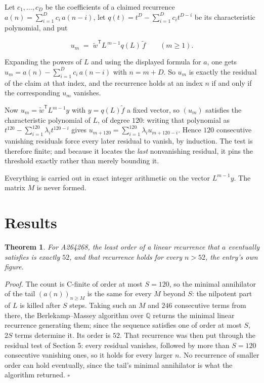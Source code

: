 \documentclass[11pt]{article}
\newtheorem{theorem}{Theorem}
\theoremstyle{definition}
\begin{document}
Let $c_1,\dots,c_D$ be the coefficients of a claimed recurrence $a(n) = \sum_{i=1}^{D} c_i\,a(n-i)$, let $q(t) = t^{D} - \sum_{i=1}^{D} c_i t^{D-i}$ be its characteristic polynomial, and put

\[u_m \;=\; \tilde w^{\mathsf T} L^{\,m-1} q(L)\,\tilde f \qquad (m \ge 1).\]

Expanding the powers of $L$ and using the displayed formula for $a$, one gets $u_m = a(n) - \sum_{i=1}^{D} c_i\,a(n-i)$ with $n = m + D$. So $u_m$ is exactly the residual of the claim at that index, and the recurrence holds at an index $n$ if and only if the corresponding $u_m$ vanishes.

Now $u_m = \tilde w^{\mathsf T} L^{m-1} y$ with $y = q(L)\tilde f$ a fixed vector, so $(u_m)$ satisfies the characteristic polynomial of $L$, of degree $120$: writing that polynomial as $t^{120} - \sum_{i=1}^{120} \lambda_i t^{120-i}$ gives $u_{m+120} = \sum_{i=1}^{120} \lambda_i u_{m+120-i}$. Hence $120$ consecutive vanishing residuals force every later residual to vanish, by induction. The test is therefore finite; and because it locates the {\itshape last} nonvanishing residual, it pins the threshold exactly rather than merely bounding it.

Everything is carried out in exact integer arithmetic on the vector $L^{m-1}y$. The matrix $M$ is never formed.

\section{Results}

\begin{theorem} For A264268, the least order of a linear recurrence that $a$ eventually satisfies is exactly $52$, and that recurrence holds for every $n > 52$, the entry's own figure.\end{theorem}

{\itshape Proof.} The count is C-finite of order at most $S = 120$, so the minimal annihilator of the tail $(a(n))_{n \ge M}$ is the same for every $M$ beyond $S$: the nilpotent part of $L$ is killed after $S$ steps. Taking such an $M$ and $246$ consecutive terms from there, the Berlekamp--Massey algorithm over $\mathbb{Q}$ returns the minimal linear recurrence generating them; since the sequence satisfies one of order at most $S$, $2S$ terms determine it. Its order is $52$. That recurrence was then put through the residual test of Section 5: every residual vanishes, followed by more than $S = 120$ consecutive vanishing ones, so it holds for every larger $n$. No recurrence of smaller order can hold eventually, since the tail's minimal annihilator is what the algorithm returned. $\square$
\end{document}
